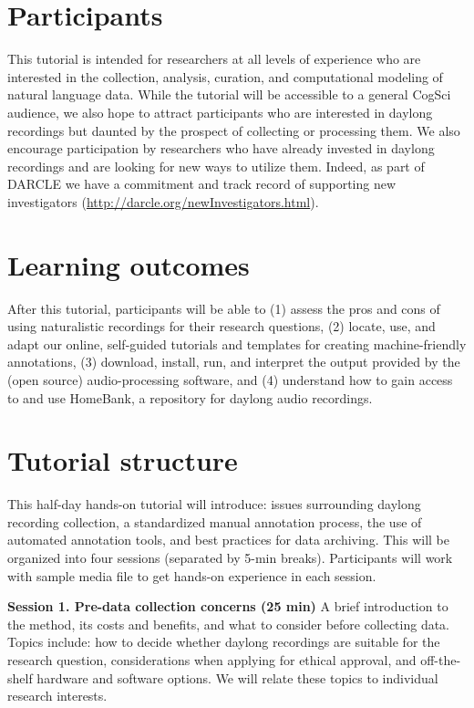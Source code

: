 \documentclass[10pt,letterpaper]{article}
\begin{document}
\section{Participants}
This tutorial is intended for researchers at all levels of experience who are interested in the collection, analysis, curation, and computational modeling of natural language data. While the tutorial %
will be accessible to a general CogSci audience, we also hope to attract participants who are interested in daylong recordings but daunted by the prospect of collecting or processing them. We also encourage participation by researchers who have already invested in daylong recordings and are looking for new ways to utilize them. Indeed, as part of DARCLE we have a commitment and track record of supporting new investigators (\url{http://darcle.org/newInvestigators.html}).

\section{Learning outcomes}
After this tutorial, participants will be able to (1) assess the pros and cons of using naturalistic recordings for their research questions, (2) locate, use, and adapt our online, self-guided tutorials and templates for creating machine-friendly annotations, (3) download, install, run, and interpret the output provided by the (open source) audio-processing software, and (4) understand how to gain access to and use HomeBank, a repository for daylong audio recordings.

\section{Tutorial structure}
This half-day hands-on tutorial will introduce: issues surrounding daylong recording collection, a standardized manual annotation process, the use of automated annotation tools, and best practices for data archiving. This will be organized into four sessions (separated by 5-min breaks). Participants will work with sample media file to get hands-on experience in each session.

\textbf{Session 1. Pre-data collection concerns (25 min)} A brief introduction to the method, its costs and benefits, and what to consider before collecting data. Topics include: how to decide whether daylong recordings are suitable for the research question, considerations when applying for ethical approval, and off-the-shelf hardware and software options. We will relate these topics to individual research interests.
\end{document}
